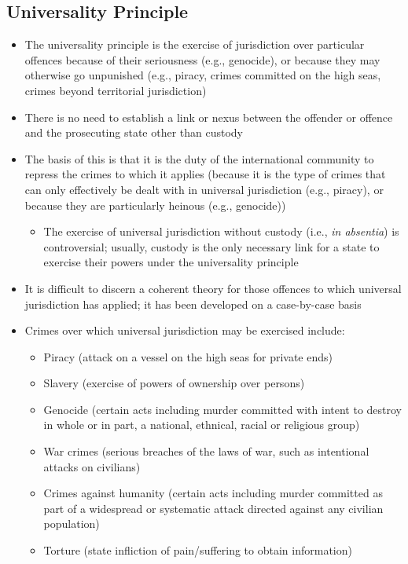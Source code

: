 \subsection{Universality Principle}
\begin{itemize}
    \item The universality principle is the exercise of jurisdiction over particular offences because of their seriousness (e.g., genocide), or because they may otherwise go unpunished (e.g., piracy, crimes committed on the high seas, crimes beyond territorial jurisdiction)
    \item There is no need to establish a link or nexus between the offender or offence and the prosecuting state other than custody
    \item The basis of this is that it is the duty of the international community to repress the crimes to which it applies (because it is the type of crimes that can only effectively be dealt with in universal jurisdiction (e.g., piracy), or because they are particularly heinous (e.g., genocide))
    \begin{itemize}
        \item The exercise of universal jurisdiction without custody (i.e., \textit{in absentia}) is controversial; usually, custody is the only necessary link for a state to exercise their powers under the universality principle
    \end{itemize}
    \item It is difficult to discern a coherent theory for those offences to which universal jurisdiction has applied; it has been developed on a case-by-case basis
    \item Crimes over which universal jurisdiction may be exercised include:
    \begin{itemize}
        \item Piracy (attack on a vessel on the high seas for private ends)
        \item Slavery (exercise of powers of ownership over persons)
        \item Genocide (certain acts including murder committed with intent to destroy in whole or in part, a national, ethnical, racial or religious group)
        \item War crimes (serious breaches of the laws of war, such as intentional attacks on civilians)
        \item Crimes against humanity (certain acts including murder committed as part of a widespread or systematic attack directed against any civilian population)
        \item Torture (state infliction of pain/suffering to obtain information)
    \end{itemize}
\end{itemize}

